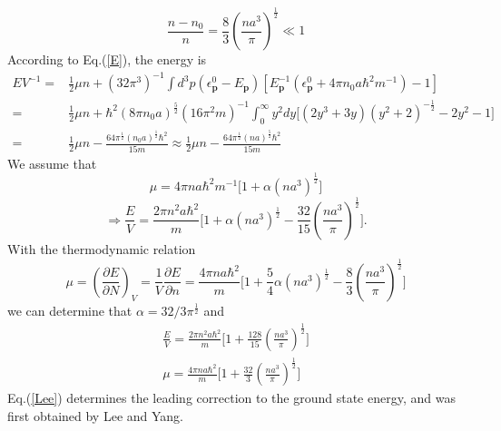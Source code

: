 \documentclass[12pt]{article}
\begin{document}
\begin{equation}
    \frac{n-n_0}{n}=\frac{8}{3}\left(\frac{na^3}{\pi}\right)^{\frac{1}{2}}\ll 1
\end{equation}
According to Eq.(\ref{E}), the energy is 
\begin{equation}
    \begin{aligned}
        E V^{-1}=&\frac{1}{2}\mu n+\left(32\pi^{3}\right)^{-1}\int d^3 p
        \left(\epsilon_{\mathbf{p}}^{0}-E_{\mathbf{p}}\right)\left[E_{\mathbf{p}}
        ^{-1}\left(\epsilon_{\mathbf{p}}^0+4\pi n_0a\hbar^2m^{-1}\right)-1\right]\\
        =&\frac{1}{2}\mu n+\hbar^{2}\left(8\pi n_0a\right)^{\frac{5}{2}}\left(16
        \pi^{2} m\right)^{-1}\int_0^{\infty}y^{2}dy\big[\left(2 y^{3}+3 y\right)
        \left(y^{2}+2\right)^{-\frac{1}{2}}-2 y^{2}-1\big] \\
        =& \frac{1}{2} \mu n-\frac{64 \pi^{\frac{1}{2}}\left(n_{0} a\right)^{\frac
        {1}{2}} \hbar^{2}}{15 m}\approx\frac{1}{2}\mu n-\frac{64\pi^{\frac{1}{2}}
        (n a)^{\frac{5}{2}} \hbar^{2}}{15 m}
        \end{aligned}
\end{equation}
We assume that 
\begin{equation}
    \mu=4 \pi n a \hbar^{2} m^{-1}\big[1+\alpha(n a^{3})^{\frac{1}{2}}\big]
\end{equation}
\begin{equation}
    \Rightarrow\frac{E}{V}=\frac{2\pi n^2a\hbar^{2}}{m}\bigg[1+\alpha(n a^3)^{
    \frac{1}{2}}-\frac{32}{15}\left(\frac{na^3}{\pi}\right)^{\frac{1}{2}}\bigg].
\end{equation} 
With the thermodynamic relation
\begin{equation}
    \mu=\left(\frac{\partial E}{\partial N}\right)_{V}=\frac{1}{V}
    \frac{\partial E}{\partial n}=\frac{4\pi na\hbar^{2}}{m}\bigg[1+\frac{5}{4}
    \alpha(na^3)^{\frac{1}{2}}-\frac{8}{3}\left(\frac{na^3}{\pi}\right)^{\frac{1}
    {2}}\bigg]
\end{equation}
we can determine that $\alpha=32/3\pi^{\frac{1}{2}}$ and 
\begin{align}
    \frac{E}{V}=\frac{2\pi n^2a\hbar^{2}}{m}\bigg[1+\frac{128}{15}\left(\frac{na^3}
    {\pi}\right)^{\frac{1}{2}}\bigg]\label{Lee}\\
    \mu=\frac{4\pi na\hbar^2}{m}\bigg[1+\frac{32}{3}\left(\frac{na^3}{\pi}\right)
    ^{\frac{1}{2}}\bigg]
\end{align}
Eq.(\ref{Lee}) determines the leading correction to the ground state energy, and 
was first obtained by Lee and Yang. 
\end{document}
